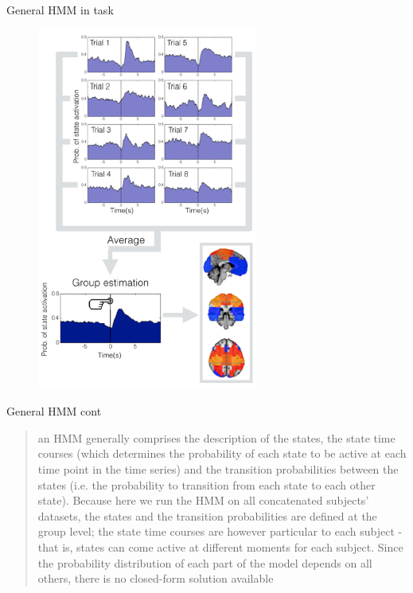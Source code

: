 \documentclass{beamer}
\begin{document}
\begin{frame}{General HMM in task}
	\begin{figure}[h]
		\centering
			\includegraphics[scale=0.6]{../Figures/fig_vidaurre_1b.png}
	\end{figure}
\end{frame}

\begin{frame}{General HMM cont }
\begin{quote}
	an HMM
	generally comprises the description of the states, the state time courses
	(which determines the probability of each state to be active at each time
	point in the time series) and the transition probabilities between the
	states (i.e. the probability to transition from each state to each other
	state). Because here we run the HMM on all concatenated subjects'
	datasets, the states and the transition probabilities are defined at the
	group level; the state time courses are however particular to each subject
	- that is, states can come active at different moments for each subject.
	Since the probability distribution of each part of the model depends on all
	others, there is no closed-form solution available
\end{quote}
\end{frame}
\end{document}
